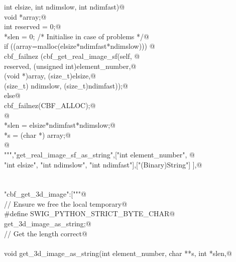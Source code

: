 \documentclass[10pt,a4paper,twoside,notitlepage]{article}
\begin{document}
\begin{flushleft}
\begin{list}{}{}
\mbox{}\verb@    int elsize, int ndimslow, int ndimfast){@\\
\mbox{}\verb@        void *array;@\\
\mbox{}\verb@        int reserved = 0;@\\
\mbox{}\verb@        *slen = 0; /* Initialise in case of problems */@\\
\mbox{}\verb@        if ((array=malloc(elsize*ndimfast*ndimslow))) {@\\
\mbox{}\verb@               cbf_failnez (cbf_get_real_image_sf(self, @\\
\mbox{}\verb@               reserved, (unsigned int)element_number,@\\
\mbox{}\verb@               (void *)array, (size_t)elsize,@\\
\mbox{}\verb@               (size_t) ndimslow, (size_t)ndimfast));@\\
\mbox{}\verb@         }else{@\\
\mbox{}\verb@               cbf_failnez(CBF_ALLOC);@\\
\mbox{}\verb@         }@\\
\mbox{}\verb@        *slen = elsize*ndimfast*ndimslow;@\\
\mbox{}\verb@        *s = (char *) array;@\\
\mbox{}\verb@      }@\\
\mbox{}\verb@""","get_real_image_sf_as_string",["int element_number", @\\
\mbox{}\verb@    "int elsize", "int ndimslow", "int ndimfast"],["(Binary)String"] ],@\\
\mbox{}\verb@@\\
\mbox{}\verb@@\\
\mbox{}\verb@"cbf_get_3d_image":["""@\\
\mbox{}\verb@// Ensure we free the local temporary@\\
\mbox{}\verb@%{@\\
\mbox{}\verb@#define SWIG_PYTHON_STRICT_BYTE_CHAR@\\
\mbox{}\verb@%}@\\
\mbox{}\verb@%cstring_output_allocate_size(char ** s, int *slen, free(*$1))@\\
\mbox{}\verb@       get_3d_image_as_string;@\\
\mbox{}\verb@// Get the length correct@\\
\mbox{}\verb@@\\
\mbox{}\verb@    void get_3d_image_as_string(int element_number, char **s, int *slen,@\\

\end{list}
\end{flushleft}
\end{document}
